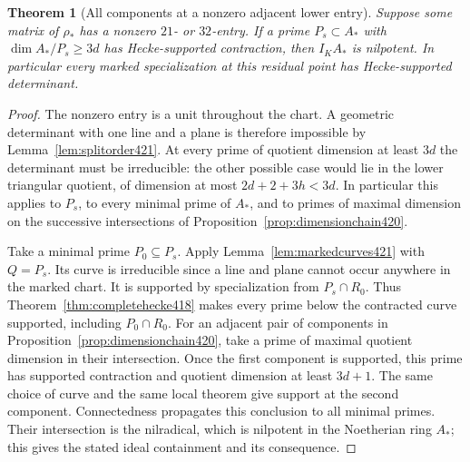 \documentclass[a4paper,11pt]{article}
\newtheorem{theorem}[proposition]{Theorem}
\theoremstyle{definition}
\theoremstyle{remark}
\numberwithin{equation}{section}
\begin{document}
\begin{theorem}[All components at a nonzero adjacent lower entry]\leavevmode
\label{thm:adjacentchart421}
Suppose some matrix of \(\rho_*\) has a nonzero \(21\)- or
\(32\)-entry. If a prime \(P_s\subset A_*\) with
\(\dim A_*/P_s\ge3d\) has Hecke-supported contraction, then
\(I_K A_*\) is nilpotent. In particular every marked
specialization at this residual point has Hecke-supported
determinant.
\end{theorem}
\begin{proof}
The nonzero entry is a unit throughout the chart. A geometric
determinant with one line and a plane is therefore impossible
by Lemma~\ref{lem:splitorder421}. At every prime of quotient
dimension at least \(3d\) the determinant must be irreducible:
the other possible case would lie in the lower triangular
quotient, of dimension at most \(2d+2+3h<3d\).
In particular this applies to \(P_s\), to every minimal prime
of \(A_*\), and to primes of maximal dimension on the successive
intersections of Proposition~\ref{prop:dimensionchain420}.

Take a minimal prime \(P_0\subseteq P_s\). Apply
Lemma~\ref{lem:markedcurves421} with \(Q=P_s\). Its curve is
irreducible since a line and plane cannot occur anywhere in
the marked chart. It is supported by specialization from
\(P_s\cap R_0\). Thus Theorem~\ref{thm:completehecke418}
makes every prime below the contracted curve supported,
including \(P_0\cap R_0\). For an adjacent pair of components
in Proposition~\ref{prop:dimensionchain420}, take a prime of
maximal quotient dimension in their intersection. Once the
first component is supported, this prime has supported
contraction and quotient dimension at least \(3d+1\). The
same choice of curve and the same local theorem give support
at the second component. Connectedness propagates this conclusion
to all minimal primes. Their intersection is the nilradical,
which is nilpotent in the Noetherian ring \(A_*\); this gives
the stated ideal containment and its consequence.
\end{proof}
\end{document}
